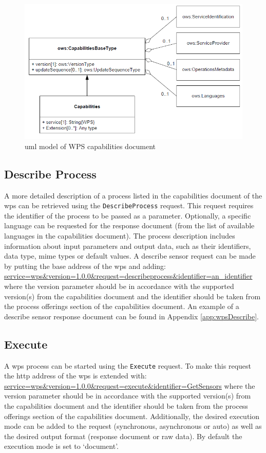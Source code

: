 \begin{figure}
	\centering
	\includegraphics[width=1\linewidth]{UML/WPSmodel2.png}
	\caption{\ac{uml} model of WPS capabilities document \citep[p. 70]{GEO:OGC}}
	\label{fig:WPSmodel2}
\end{figure}

\subsection{Describe Process}
\begin{sloppypar}
A more detailed description of a process listed in the capabilities document of the \ac{wps} can be retrieved using the \texttt{DescribeProcess} request. This request requires the identifier of the process to be passed as a parameter. Optionally, a specific language can be requested for the response document (from the list of available languages in the capabilities document). The process description includes information about input parameters and output data, such as their identifiers, data type, mime types or default values. A describe sensor request can be made by putting the base address of the \ac{wps} and adding: \url{service=wps&version=1.0.0&request=describeprocess&identifier=an_identifier} where the version parameter should be in accordance with the supported version(s) from the capabilities document and the identifier should be taken from the process offerings section of the capabilities document. An example of a describe sensor response document can be found in Appendix \ref{app:wpsDescribe}.  
\end{sloppypar}


\subsection{Execute}
A \ac{wps} process can be started using the \texttt{Execute} request. To make this request the \ac{http} address of the \ac{wps} is extended with: \url{service=wps&version=1.0.0&request=execute&identifier=GetSensors} where the version parameter should be in accordance with the supported version(s) from the capabilities document and the identifier should be taken from the process offerings section of the capabilities document. Additionally, the desired execution mode can be added to the request (synchronous, asynchronous or auto) as well as the desired output format (response document or raw data). By default the execution mode is set to `document'.

